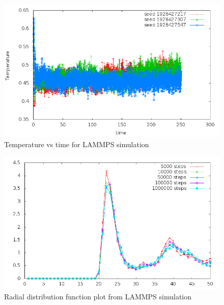 \documentclass{article}
\begin{document}
\begin{doublespacing}
\begin{figure}[H]
\begin{center}
\includegraphics[scale=0.8]{temp_vs_time} 
\caption{Temperature vs time for LAMMPS simulation}  
\label{TV_lammp} 
\end{center}
\end{figure}

\begin{figure}[H]
\begin{center}
\includegraphics[scale=0.8]{RDF_MD} 
\caption{Radial distribution function plot from LAMMPS simulation}
\label{RDF_lammp} 
\end{center}
\end{figure}


\end{doublespacing}
\end{document}
